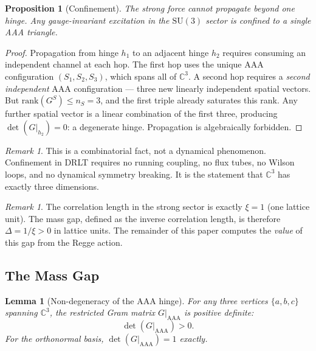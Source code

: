 \documentclass[12pt]{article}
\newtheorem{lemma}[theorem]{Lemma}
\newtheorem{proposition}[theorem]{Proposition}
\theoremstyle{remark}
\newtheorem{remark}[theorem]{Remark}
\theoremstyle{definition}
\newcommand{\CC}{\mathbb{C}}
\begin{document}
\begin{proposition}[Confinement]
\label{prop:confinement}
The strong force cannot propagate beyond one hinge. Any gauge-invariant
excitation in the $\mathrm{SU}(3)$ sector is confined to a single AAA
triangle.
\end{proposition}

\begin{proof}
Propagation from hinge $h_1$ to an adjacent hinge $h_2$ requires
consuming an independent channel at each hop. The first hop uses the
unique AAA configuration $(S_1, S_2, S_3)$, which spans all of
$\CC^3$. A second hop requires a \emph{second independent} AAA
configuration --- three new linearly independent spatial vectors. But
$\mathrm{rank}(G^S) \leq n_S = 3$, and the first triple already
saturates this rank. Any further spatial vector is a linear combination
of the first three, producing $\det(G|_{h_2}) = 0$: a degenerate hinge.
Propagation is algebraically forbidden.
\end{proof}

\begin{remark}
This is a combinatorial fact, not a dynamical phenomenon. Confinement
in DRLT requires no running coupling, no flux tubes, no Wilson loops,
and no dynamical symmetry breaking. It is the statement that
$\CC^3$ has exactly three dimensions.
\end{remark}

\begin{remark}
The correlation length in the strong sector is exactly $\xi = 1$ (one
lattice unit). The mass gap, defined as the inverse correlation length,
is therefore $\Delta = 1/\xi > 0$ in lattice units. The remainder of
this paper computes the \emph{value} of this gap from the Regge action.
\end{remark}

\subsection{The Mass Gap}
\label{sec:massgap}

\begin{lemma}[Non-degeneracy of the AAA hinge]
\label{lem:det}
For any three vertices $\{a, b, c\}$ spanning $\CC^3$, the
restricted Gram matrix $G|_{\mathrm{AAA}}$ is positive definite:
\begin{equation}
\det(G|_{\mathrm{AAA}}) > 0.
\end{equation}
For the orthonormal basis, $\det(G|_{\mathrm{AAA}}) = 1$ exactly.
\end{lemma}
\end{document}
